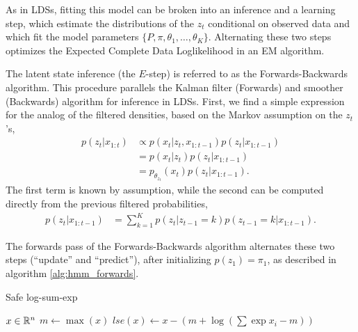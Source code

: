 \documentclass[14pt]{extreport}
\begin{document}
As in LDSs, fitting this model can be broken into an inference and a learning
step, which estimate the distributions of the $z_{t}$ conditional on observed
data and which fit the model parameters $\{P, \pi, \theta_{1}, \dots,
\theta_{K}\}$. Alternating these two steps optimizes the Expected Complete Data
Loglikelihood in an EM algorithm.

The latent state inference (the $E$-step) is referred to as the
Forwards-Backwards algorithm. This procedure parallels the Kalman filter
(Forwards) and smoother (Backwards) algorithm for inference in LDSs. First,
we find a simple expression for the analog of the filtered densities, based on
the Markov assumption on the $z_{t}$'s,
\begin{align*}
  p\left(z_{t} \vert x_{1:t}\right) &\propto p\left(x_{t} \vert z_{t}, x_{1:t - 1}\right) p\left(z_{t} \vert x_{1:t - 1}\right) \\
  &= p\left(x_{t} \vert z_{t}\right) p\left(z_{t} \vert x_{1:t - 1}\right) \\
  &= p_{\theta_{z_{t}}}\left(x_{t}\right)p\left(z_{t} \vert x_{1:t - 1}\right).
\end{align*}
The first term is known by assumption, while the second can be computed directly
from the previous filtered probabilities,
\begin{align*}
  p\left(z_{t} \vert x_{1:t - 1}\right) &= \sum_{k = 1}^{K} p\left(z_{t} \vert z_{t - 1} = k\right)p\left(z_{t - 1} = k \vert x_{1:t - 1} \right).
\end{align*}

The forwards pass of the Forwards-Backwards algorithm alternates these two steps
(``update'' and ``predict''), after initializing $p\left(z_{1}\right) =
\pi_{1}$, as described in algorithm \ref{alg:hmm_forwards}.

\begin{algorithm}
   \caption{Safe log-sum-exp}
   \label{alg:normalize_log}
   \begin{algorithmic}
      $x \in \mathbb{R}^{n}$
     \STATE $m \leftarrow \max\left(x\right)$
      $lse\left(x\right) \leftarrow x - \left(m + \log\left(\sum\exp{x_{i} - m}\right)\right)$
   \end{algorithmic}
\end{algorithm}
\end{document}
